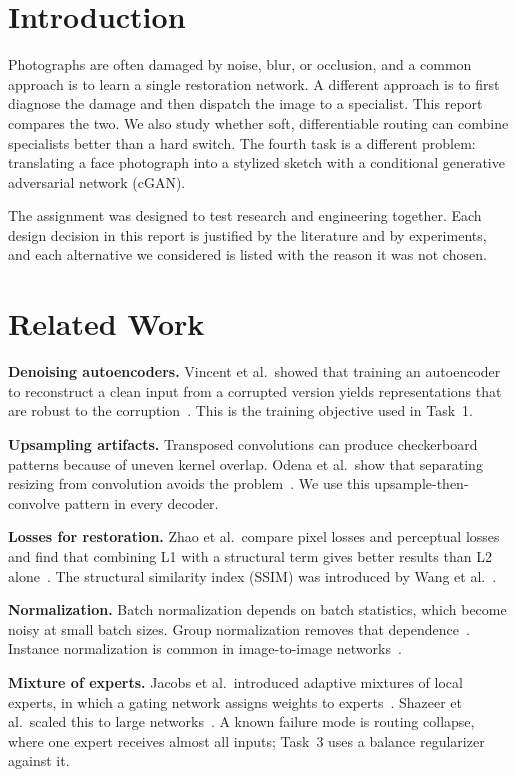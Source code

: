 \documentclass[conference]{IEEEtran}
\begin{document}
\section{Introduction}
Photographs are often damaged by noise, blur, or occlusion, and a common approach is to learn a
single restoration network. A different approach is to first diagnose the damage and then
dispatch the image to a specialist. This report compares the two. We also study whether soft,
differentiable routing can combine specialists better than a hard switch. The fourth task is a
different problem: translating a face photograph into a stylized sketch with a conditional
generative adversarial network (cGAN).

The assignment was designed to test research and engineering together. Each design decision in
this report is justified by the literature and by experiments, and each alternative we considered
is listed with the reason it was not chosen.

\section{Related Work}
\textbf{Denoising autoencoders.} Vincent et al.\ showed that training an autoencoder to
reconstruct a clean input from a corrupted version yields representations that are robust to the
corruption~\cite{vincent2008dae}. This is the training objective used in Task~1.

\textbf{Upsampling artifacts.} Transposed convolutions can produce checkerboard patterns because of
uneven kernel overlap. Odena et al.\ show that separating resizing from convolution avoids the
problem~\cite{odena2016checkerboard}. We use this upsample-then-convolve pattern in every decoder.

\textbf{Losses for restoration.} Zhao et al.\ compare pixel losses and perceptual losses and find
that combining L1 with a structural term gives better results than L2 alone~\cite{zhao2017loss}.
The structural similarity index (SSIM) was introduced by Wang et al.~\cite{wang2004ssim}.

\textbf{Normalization.} Batch normalization depends on batch statistics, which become noisy at
small batch sizes. Group normalization removes that dependence~\cite{wu2018gn}. Instance
normalization is common in image-to-image networks~\cite{ulyanov2016in}.

\textbf{Mixture of experts.} Jacobs et al.\ introduced adaptive mixtures of local experts, in
which a gating network assigns weights to experts~\cite{jacobs1991moe}. Shazeer et al.\ scaled this
to large networks~\cite{shazeer2017moe}. A known failure mode is routing collapse, where one
expert receives almost all inputs; Task~3 uses a balance regularizer against it.
\end{document}
